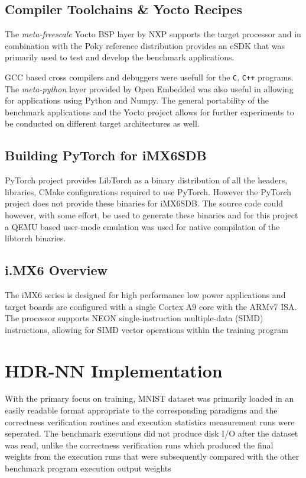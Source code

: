 \subsection{Compiler Toolchains \& Yocto Recipes}

The \textit{meta-freescale} Yocto BSP layer by NXP supports the target processor and in combination with the Poky reference distribution provides an eSDK that was primarily used to test and develop the benchmark applications.

GCC based cross compilers and debuggers were usefull for the \texttt{C}, \texttt{C++}  programs. The \textit{meta-python} layer provided by Open Embedded was also useful in allowing for applications using Python and Numpy. The general portability of the benchmark applications and the Yocto project allows for further experiments to be conducted on different target architectures as well.

\subsection{Building PyTorch for iMX6SDB}

PyTorch project provides LibTorch as a binary distribution of all the headers, libraries, CMake configurations required to use PyTorch. However the PyTorch project does not provide these binaries for iMX6SDB. The source code could however, with some effort, be used to generate these binaries and for this project a QEMU based user-mode emulation was used for native compilation of the libtorch binaries.

\subsection[ECU / iMX6 Evaluation Board Overview]{i.MX6 Overview}

The iMX6 series is designed for high performance low power applications and target boards are configured with a single Cortex A9 core with the ARMv7 ISA. The processor supports NEON single-instruction multiple-data (SIMD) instructions, allowing for SIMD vector operations within the training program

\section{HDR-NN Implementation}

With the primary focus on training, MNIST dataset was primarily loaded in an easily readable format appropriate to the corresponding paradigms and the correctness verification routines and execution statistics measurement runs were seperated. The benchmark executions did not produce disk I/O after the dataset was read, unlike the correctness verification runs which produced the final weights from the execution runs that were subsequently compared with the other benchmark program execution output weights

